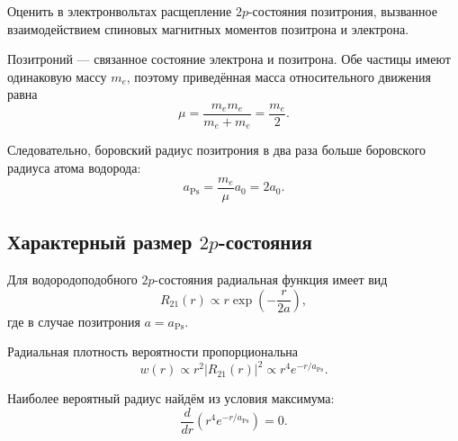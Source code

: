 \documentclass[../final.tex]{subfiles}
\begin{document}



\condition
Оценить в электронвольтах расщепление $2p$-состояния позитрония,
вызванное взаимодействием спиновых магнитных моментов позитрона
и электрона.



\solution

Позитроний --- связанное состояние электрона и позитрона.
Обе частицы имеют одинаковую массу $m_e$, поэтому приведённая масса
относительного движения равна
%
\begin{equation*}
    \mu
    =
    \frac{m_em_e}{m_e+m_e}
    =
    \frac{m_e}{2}.
\end{equation*}

Следовательно, боровский радиус позитрония в два раза больше
боровского радиуса атома водорода:
%
\begin{equation*}
    a_{\mathrm{Ps}}
    =
    \frac{m_e}{\mu}a_0
    =
    2a_0.
\end{equation*}



\subsection*{Характерный размер \texorpdfstring{$2p$}{2p}-состояния}

Для водородоподобного $2p$-состояния радиальная функция имеет вид
%
\begin{equation*}
    R_{21}(r)
    \propto
    r\exp\left(-\frac{r}{2a}\right),
\end{equation*}
%
где в случае позитрония $a=a_{\mathrm{Ps}}$.

Радиальная плотность вероятности пропорциональна
%
\begin{equation*}
    w(r)
    \propto
    r^2|R_{21}(r)|^2
    \propto
    r^4e^{-r/a_{\mathrm{Ps}}}.
\end{equation*}

Наиболее вероятный радиус найдём из условия максимума:
%
\begin{equation*}
    \frac{d}{dr}
    \left(
        r^4e^{-r/a_{\mathrm{Ps}}}
    \right)
    =
    0.
\end{equation*}
\end{document}
